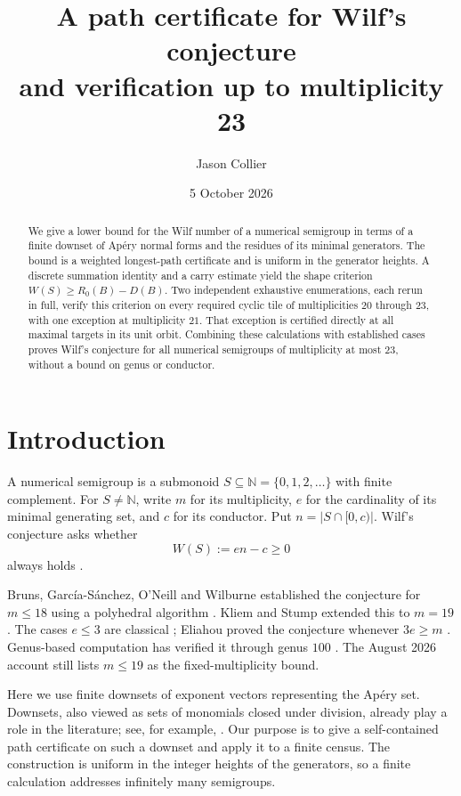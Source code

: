 \documentclass[11pt]{article}
\title{A path certificate for Wilf's conjecture\\and verification up to multiplicity 23}
\author{Jason Collier}
\date{5 October 2026}
\theoremstyle{definition}
\theoremstyle{remark}
\newcommand{\N}{\mathbb{N}}
\begin{document}
\maketitle

\begin{abstract}
We give a lower bound for the Wilf number of a numerical semigroup in
terms of a finite downset of Ap\'ery normal forms and the residues of its
minimal generators. The bound is a weighted longest-path certificate
and is uniform in the generator heights. A discrete summation identity
and a carry estimate yield the shape criterion $W(S)\ge R_0(B)-D(B)$.
Two independent exhaustive enumerations, each rerun in full,
verify this criterion on every required cyclic tile of multiplicities
$20$ through $23$, with one exception at multiplicity $21$. That exception
is certified directly at all maximal targets in its unit orbit.
Combining these calculations with established cases proves Wilf's
conjecture for all numerical semigroups of multiplicity at most $23$,
without a bound on genus or conductor.
\end{abstract}

\section{Introduction}

A numerical semigroup is a submonoid $S\subseteq\N=\{0,1,2,\ldots\}$
with finite complement. For $S\ne\N$, write $m$ for its multiplicity,
$e$ for the cardinality of its minimal generating set, and $c$ for its
conductor. Put $n=|S\cap[0,c)|$. Wilf's conjecture asks whether
\begin{equation}\label{eq:wilf}
 W(S):=en-c\ge0
\end{equation}
always holds \cite{Wilf}.

Bruns, Garc\'ia-S\'anchez, O'Neill and Wilburne established the
conjecture for $m\le18$ using a polyhedral algorithm \cite{BGOW}.
Kliem and Stump extended this to $m=19$ \cite{KS}. The cases $e\le3$
are classical \cite{FGH,DM}; Eliahou proved the conjecture whenever
$3e\ge m$ \cite{EliahouGraph}. Genus-based computation has verified it
through genus $100$ \cite{DEF}. The August 2026 account \cite{Marashdeh}
still lists $m\le19$ as the fixed-multiplicity bound.

Here we use finite downsets of exponent vectors representing the
Ap\'ery set. Downsets, also viewed as sets of monomials closed under
division, already play a role in the literature; see, for example,
\cite{EliahouDivsets}. Our purpose is to give a self-contained path
certificate on such a downset and apply it to a finite census. The
construction is uniform in the integer heights of the generators, so a
finite calculation addresses infinitely many semigroups.
\end{document}
